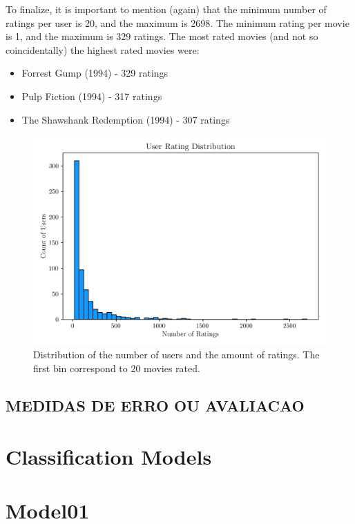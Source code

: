\documentclass[conference]{IEEEtran}
\begin{document}
To finalize, it is important to mention (again) that the minimum number of ratings per user is 20, and the maximum is 2698. The minimum rating per movie is 1, and the maximum is 329 ratings. The most rated movies (and not so coincidentally) the highest rated movies were:
\begin{itemize}
    \item Forrest Gump (1994) - 329 ratings
    \item Pulp Fiction (1994) - 317 ratings
    \item The Shawshank Redemption (1994) - 307 ratings
\end{itemize}


\begin{figure}[H]
    \centering
    \includegraphics[width=1\linewidth]{assets/distribution_userratings.png}
    \caption{Distribution of the number of users and the amount of ratings. The first bin correspond to 20 movies rated.}    \label{fig:distribution_userratings}
\end{figure}

\subsection{MEDIDAS DE ERRO OU AVALIACAO}




\section{Classification Models}


\section{Model01}
\end{document}
